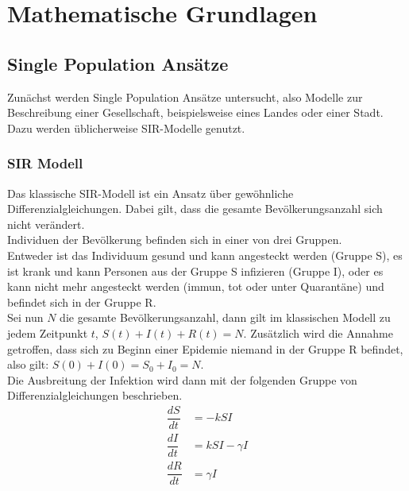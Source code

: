 \section{Mathematische Grundlagen}
\subsection{Single Population Ansätze}\label{ssec:spa}
\ellen
Zunächst werden Single Population Ansätze untersucht, also Modelle zur Beschreibung einer Gesellschaft, beispielsweise eines Landes oder einer Stadt. Dazu werden üblicherweise SIR-Modelle genutzt.

\subsubsection{SIR Modell}
\ellen
Das klassische SIR-Modell ist ein Ansatz über gewöhnliche Differenzialgleichungen. Dabei gilt, dass die gesamte Bevölkerungsanzahl sich nicht verändert.\\
Individuen der Bevölkerung befinden sich in einer von drei Gruppen.\\
Entweder ist das Individuum gesund und kann angesteckt werden (Gruppe S), es ist krank und kann Personen aus der Gruppe S infizieren (Gruppe I), oder es kann nicht mehr angesteckt werden (immun, tot oder unter Quarantäne) und befindet sich in der Gruppe R.\\
Sei nun $N$ die gesamte Bevölkerungsanzahl, dann gilt im klassischen Modell zu jedem Zeitpunkt $t$, $S(t)+I(t)+R(t) = N$. Zusätzlich wird die Annahme getroffen, dass sich zu Beginn einer Epidemie niemand in der Gruppe R befindet, also gilt: $S(0)+I(0)= S_0+I_0 = N$.\\
Die Ausbreitung der Infektion wird dann mit der folgenden Gruppe von Differenzialgleichungen beschrieben.
\begin{align}
\dfrac{dS}{dt} &= -kSI\\
\dfrac{dI}{dt} &= kSI- \gamma I\\
\dfrac{dR}{dt} &= \gamma I
\end{align}

